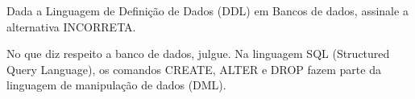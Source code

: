 \documentclass[12pt,answers]{exam}
\begin{document}
\begin{questions}

\question Dada a Linguagem de Definição de Dados (DDL) em Bancos de dados, assinale a alternativa INCORRETA.


\question No que diz respeito a banco de dados, julgue. Na linguagem SQL (Structured Query Language), os comandos CREATE, ALTER e DROP fazem parte da linguagem de manipulação de dados (DML). 

\end{questions}
\end{document}
